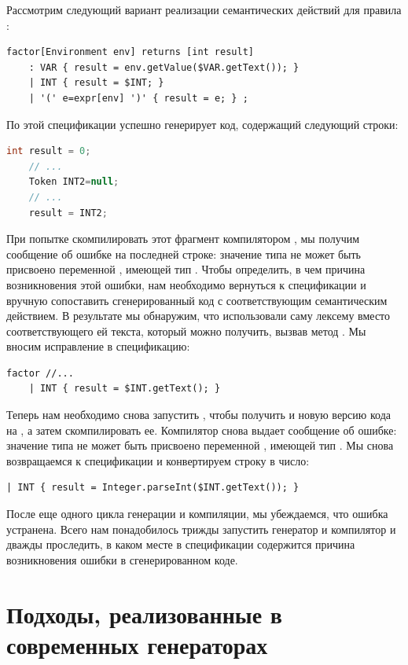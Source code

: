 Рассмотрим следующий вариант реализации семантических действий для правила :
\begin{lstlisting}[language=ANTLR]
factor[Environment env] returns [int result]
	: VAR { result = env.getValue($VAR.getText()); }
	| INT { result = $INT; }
	| '(' e=expr[env] ')' { result = e; } ;
\end{lstlisting}
По этой спецификации  успешно генерирует код, содержащий следующий строки:
\begin{lstlisting}[language=Java,escapechar={!}]
	int result = 0;
	// ...
	Token INT2=null;
	// ...
	result = INT2;
\end{lstlisting}
При попытке скомпилировать этот фрагмент компилятором , мы получим сообщение об ошибке на последней строке: значение  типа  не может быть присвоено переменной , имеющей тип . Чтобы определить, в чем причина возникновения этой ошибки, нам необходимо вернуться к спецификации и вручную сопоставить сгенерированный код с соответствующим семантическим действием. В результате мы обнаружим, что использовали саму лексему  вместо соответствующего ей текста, который можно получить, вызвав метод . Мы вносим исправление в спецификацию:
\begin{lstlisting}[language=ANTLR]
factor //...
	| INT { result = $INT.getText(); }
\end{lstlisting}%
Теперь нам необходимо снова запустить , чтобы получить и новую версию кода на , а затем скомпилировать ее. Компилятор снова выдает сообщение об ошибке: значение  типа  не может быть присвоено переменной , имеющей тип . Мы снова возвращаемся к спецификации и конвертируем строку в число:
\begin{lstlisting}[language=ANTLR]
	| INT { result = Integer.parseInt($INT.getText()); }
\end{lstlisting}%
После еще одного цикла генерации и компиляции, мы убеждаемся, что ошибка устранена. Всего нам понадобилось трижды запустить генератор и компилятор и дважды проследить, в каком месте в спецификации содержится причина возникновения ошибки в сгенерированном коде.

\section{Подходы, реализованные в современных генераторах}

